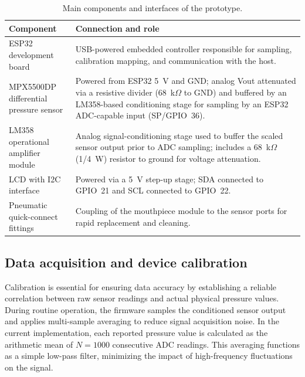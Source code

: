 \documentclass{ieeeaccess}
\begin{document}
\begin{table}[htp]
  \centering
  \caption{Main components and interfaces of the prototype.}
  \label{tab:3dppd_hw_interfaces}
  \renewcommand{\arraystretch}{1.2}
  \begin{tabularx}{\columnwidth}{@{}lX@{}}
    \toprule
    \textbf{Component} & \textbf{Connection and role} \\
    \midrule
    ESP32 development board & USB-powered embedded controller responsible for sampling, calibration mapping, and communication with the host. \\
    
    \makecell[tl]{MPX5500DP differential\\ pressure sensor} & Powered from ESP32 5~V and GND; analog Vout attenuated via a resistive divider (68~k$\Omega$ to GND) and buffered by an LM358-based conditioning stage for sampling by an ESP32 ADC-capable input (SP/GPIO~36). \\
        
    \makecell[tl]{LM358 operational\\ amplifier module} & Analog signal-conditioning stage used to buffer the scaled sensor output prior to ADC sampling; includes a 68~k$\Omega$ (1/4~W) resistor to ground for voltage attenuation. \\
    
    LCD with I2C interface & Powered via a 5~V step-up stage; SDA connected to GPIO~21 and SCL connected to GPIO~22. \\
    \makecell[tl]{Pneumatic quick-connect\\ fittings} & Coupling of the mouthpiece module to the sensor ports for rapid replacement and cleaning. \\
    \bottomrule
  \end{tabularx}
\end{table}

\subsection{Data acquisition and device calibration}

Calibration is essential for ensuring data accuracy by establishing a reliable correlation between raw sensor readings and actual physical pressure values. During routine operation, the firmware samples the conditioned sensor output and applies multi-sample averaging to reduce signal acquisition noise. In the current implementation, each reported pressure value is calculated as the arithmetic mean of \(N=1000\) consecutive ADC readings. This averaging functions as a simple low-pass filter, minimizing the impact of high-frequency fluctuations on the signal.
\end{document}
